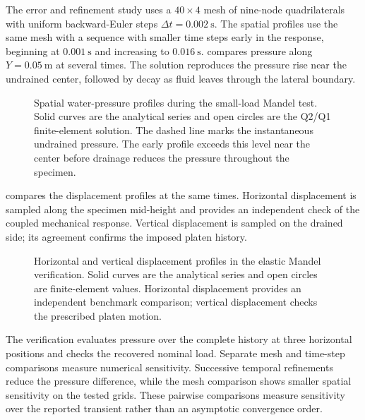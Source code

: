 The error and refinement study uses a \(40\times4\) mesh of nine-node
quadrilaterals with uniform backward-Euler steps
\(\Delta t=0.002\ \mathrm{s}\).  The spatial profiles use the same mesh with
a sequence with smaller time steps early in the response, beginning at \(0.001\ \mathrm{s}\) and increasing
to \(0.016\ \mathrm{s}\).
 compares pressure along
\(Y=0.05\ \mathrm{m}\) at several times.  The solution reproduces the
pressure rise near the undrained center, followed by decay as fluid leaves
through the lateral boundary.

\begin{figure}[ht]
 \centering
 \caption{Spatial water-pressure profiles during the small-load Mandel test.
 Solid curves are the analytical series and open circles are the Q2/Q1
 finite-element solution.  The dashed line marks the instantaneous undrained
 pressure.  The early profile exceeds this level near the center before
 drainage reduces the pressure throughout the specimen.}
 \label{fig:mandel-pressure-profiles}
\end{figure}

 compares the displacement profiles at the
same times.  Horizontal displacement is sampled along the specimen mid-height and
provides an independent check of the coupled mechanical response.  Vertical
displacement is sampled on the drained side; its agreement confirms the
imposed platen history.

\begin{figure}[ht]
 \centering
 \caption{Horizontal and vertical displacement profiles in the elastic Mandel
 verification.  Solid curves are the analytical series and open circles are
 finite-element values.  Horizontal displacement provides an independent
 benchmark comparison; vertical displacement checks the prescribed platen
 motion.}
 \label{fig:mandel-displacements}
\end{figure}

The verification evaluates pressure over the complete history at three
horizontal positions and checks the recovered nominal load.  Separate mesh
and time-step comparisons measure numerical sensitivity.  Successive temporal
refinements reduce the pressure difference, while the mesh comparison shows
smaller spatial sensitivity on the tested grids.  These pairwise comparisons
measure sensitivity over the reported transient rather than an asymptotic
convergence order.

